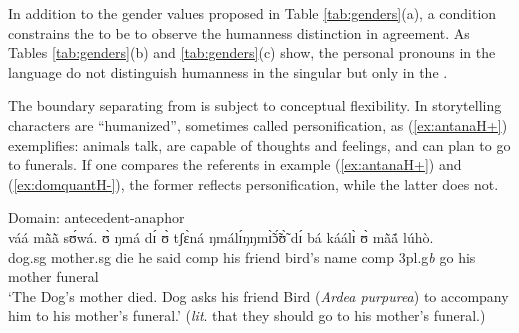 \begin{exe}
\begin{exe}
\begin{exe}
\begin{exe}
\begin{exe}
\begin{exe}
\begin{exe}
\begin{exe}
\begin{exe}
\begin{exe}
\begin{exe}
\begin{table}


\end{table}



  In addition to the gender values proposed in Table \ref{tab:genders}(a),  a condition constrains the  to be  to observe the humanness distinction in agreement. As Tables \ref{tab:genders}(b)  and   \ref{tab:genders}(c) show, the personal pronouns in the language do not distinguish humanness in the singular but only in the .
 
 The boundary separating  from  is subject to conceptual flexibility. In storytelling  characters are ``humanized'', sometimes called personification, as (\ref{ex:antanaH+}) exemplifies: animals talk, are capable of thoughts and feelings, and can plan to go to funerals. If one compares the  referents in example (\ref{ex:antanaH+}) and (\ref{ex:domquantH-}), the former reflects personification, while the latter does not.
 

  \ea\label{ex:antanaH+}{\rm Domain: antecedent-anaphor}\\
\gll   váá  mã̀ã̀  sʊ́wá.   ʊ̀   ŋmá   dɪ́   ʊ̀  tʃɛ̀ná  ŋmálɪ́ŋŋmɪ̃̀ɔ̃́ʊ̃̀   dɪ́   bá  káálɪ̀  ʊ̀ mã̀ã́  lúhò.\\
    dog.{\sc sg} mother.{\sc sg} {die} {he} {said} {\sc comp} {his} {friend} {bird's name} {\sc comp} {{\sc 3pl.g}{\it b}} {go} {his} {mother} {funeral}\\
\glt `The Dog's mother died. Dog asks his friend Bird ({\it Ardea purpurea}) to accompany him to his mother's funeral.'  ({\it lit}. that they should go to his mother's funeral.) 
\z


\end{exe}
\end{exe}
\end{exe}
\end{exe}
\end{exe}
\end{exe}
\end{exe}
\end{exe}
\end{exe}
\end{exe}
\end{exe}
